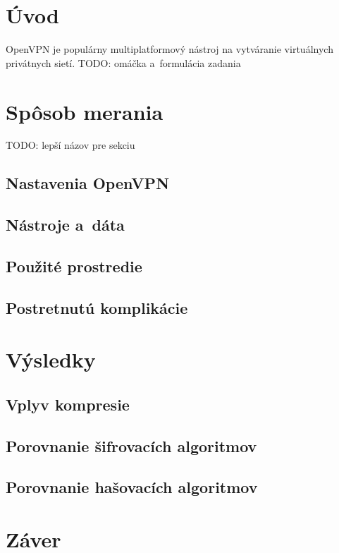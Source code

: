 \documentclass[12pt,a4paper]{article}
\begin{document}
\section{Úvod}

OpenVPN je populárny multiplatformový nástroj na vytváranie virtuálnych
privátnych sietí.
TODO: omáčka a~formulácia zadania

\section{Spôsob merania}
TODO: lepší názov pre sekciu

\subsection{Nastavenia OpenVPN}

\subsection{Nástroje a~dáta}

\subsection{Použité prostredie}

\subsection{Postretnutú komplikácie}

\section{Výsledky}

\subsection{Vplyv kompresie}

\subsection{Porovnanie šifrovacích algoritmov}

\subsection{Porovnanie hašovacích algoritmov}

\section{Záver}

\end{document}
